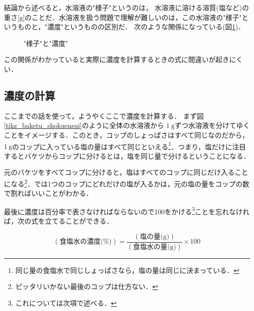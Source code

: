 \documentclass[dvipdfmx,18pt]{jsarticle}
\begin{document}
    結論から述べると，水溶液の"様子"というのは，
    水溶液に溶ける溶質(塩など)の重さ[\(\mathrm{g}\)]のことだ．水溶液を扱う問題で理解が難しいのは，この水溶液の"様子"というものと，"濃度"というものの区別だ．
    次のような関係になっている(図\ref{tikz_yosu_nodo})．

    \begin{figure}[htbp]\centering
        \caption{"様子"と"濃度"}
        \label{tikz_yosu_nodo}
    \end{figure}

    この関係がわかっていると実際に濃度を計算するときの式に間違いが起きにくい．

    \subsection{濃度の計算}
    ここまでの話を使って，ようやくここで濃度を計算する．
    まず図\ref{tikz_baketu_shokuensui}のように全体の水溶液から \(1\ \mathrm{{g}}\)ずつ水溶液を分けてゆくことをイメージする．このとき，コップのしょっぱさはすべて同じなのだから， \(1\ \mathrm{g}\)のコップに入っている塩の量はすべて同じといえる\footnote{同じ量の食塩水で同じしょっぱさなら，塩の量は同じに決まっている．}．つまり，塩だけに注目するとバケツからコップに分けるとは，塩を同じ量で分けるということになる．

    元のバケツをすべてコップに分けると，塩はすべてのコップに同じだけ入ることになる\footnote{ピッタリいかない最後のコップは仕方ない．}．では1つのコップにどれだけの塩が入るかは，元の塩の量をコップの数で割ればいいことがわかる．


    最後に濃度は百分率で表さなければならないので100をかける\footnote{これについては次項で述べる．}ことを忘れなければ，次の式を立てることができる．

    \begin{equation}
        (\text{食塩水の濃度(\%)}) = \frac{(\text{塩の量(g)})}{(\text{食塩水の量(g)})}\times 100
    \end{equation}
\end{document}
